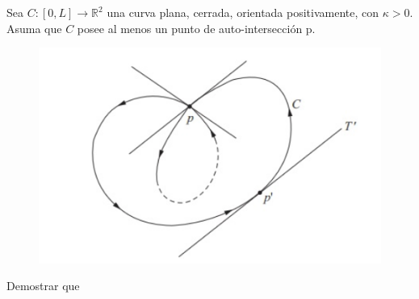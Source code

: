 \begin{problema}
    Sea $C:[0, L] \rightarrow \mathbb{R}^{2}$ una curva plana, cerrada, orientada positivamente, con $\kappa>0$. Asuma que $C$ posee al menos un punto de auto-intersección p. 
    \begin{figure}[H]
        \centering
        \includegraphics[scale=0.5]{imagenes/im5.png}
    \end{figure}
    
    Demostrar que


\end{problema}
